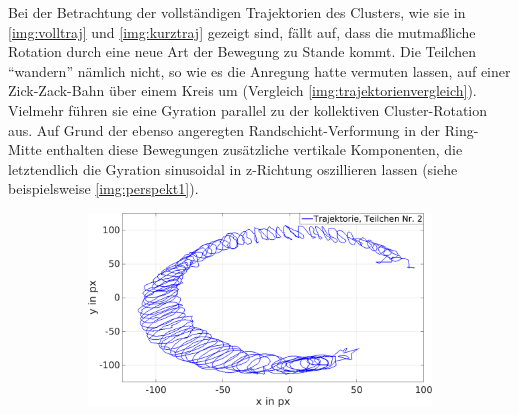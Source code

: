         Bei der Betrachtung der vollständigen Trajektorien des Clusters, wie sie in \autoref{img:volltraj} und \autoref{img:kurztraj} gezeigt sind, fällt auf, dass die mutmaßliche Rotation durch eine neue Art der Bewegung zu Stande kommt. Die Teilchen "`wandern"' nämlich nicht, so wie es die Anregung hatte vermuten lassen, auf einer Zick-Zack-Bahn über einem Kreis um (Vergleich \autoref{img:trajektorienvergleich}). Vielmehr führen sie eine Gyration parallel zu der kollektiven Cluster-Rotation aus. Auf Grund der ebenso angeregten Randschicht-Verformung in der Ring-Mitte enthalten diese Bewegungen zusätzliche vertikale Komponenten, die letztendlich die Gyration sinusoidal in z-Richtung oszillieren lassen (siehe beispielsweise \autoref{img:perspekt1}).

          \begin{figure}[!h]
            \centering
            \begin{subfigure}{0.49\textwidth}
              \includegraphics[width=\textwidth,height=0.8\textwidth]{figs/auswertung/gyratauszuglang.png}
              \caption{}\label{img:kreisbahn}
            \end{subfigure}
            \begin{subfigure}{0.49\textwidth}

\end{subfigure}
\end{figure}

